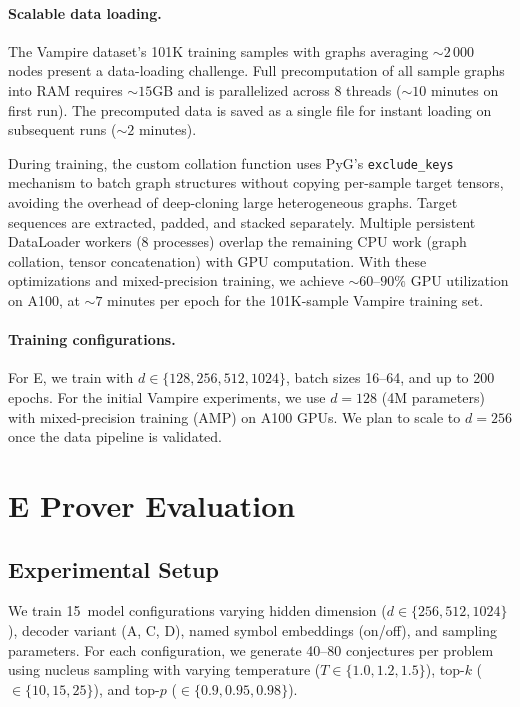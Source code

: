 \documentclass{easychair}
\newcommand{\Eprover}{E\xspace}
\newcommand{\Vampire}{Vampire\xspace}
\begin{document}
\paragraph{Scalable data loading.}
The \Vampire dataset's 101K training samples with graphs averaging
${\sim}2\,000$ nodes present a data-loading challenge.  Full
precomputation of all sample graphs into RAM requires ${\sim}15$GB
and is parallelized across 8 threads (${\sim}10$ minutes on first
run).  The precomputed data is saved as a single file for instant
loading on subsequent runs (${\sim}2$ minutes).

During training, the custom collation function uses PyG's
\texttt{exclude\_keys} mechanism to batch graph structures without
copying per-sample target tensors, avoiding the overhead of
deep-cloning large heterogeneous graphs.  Target sequences are
extracted, padded, and stacked separately.  Multiple persistent
DataLoader workers (8 processes) overlap the remaining CPU work
(graph collation, tensor concatenation) with GPU computation.  With
these optimizations and mixed-precision training, we achieve
${\sim}60$--$90\%$ GPU utilization on A100, at ${\sim}7$ minutes
per epoch for the 101K-sample \Vampire training set.

\paragraph{Training configurations.}
For \Eprover, we train with $d \in \{128, 256, 512, 1024\}$,
batch sizes 16--64, and up to 200 epochs.
For the initial \Vampire experiments, we use $d = 128$ (4M
parameters) with mixed-precision training (AMP) on A100 GPUs.
We plan to scale to $d = 256$ once the data pipeline is validated.


\section{E Prover Evaluation}
\label{sec:eprover-results}

\subsection{Experimental Setup}

We train 15~model configurations varying hidden dimension ($d \in
\{256, 512, 1024\}$), decoder variant (A, C, D), named symbol
embeddings (on/off), and sampling parameters.  For each configuration,
we generate 40--80 conjectures per problem using nucleus sampling with
varying temperature ($T \in \{1.0, 1.2, 1.5\}$), top-$k$ ($\in
\{10, 15, 25\}$), and top-$p$ ($\in \{0.9, 0.95, 0.98\}$).
\end{document}
